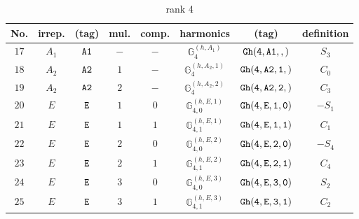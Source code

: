 \documentclass[fleqn,8pt]{jsarticle}
\begin{document}
\begin{table}[ht!]
\begin{center}
\caption{rank 4}
\renewcommand{\arraystretch}{1.3}
\begin{tabular}{cccccccc} \hline \hline
No. & irrep. & (tag) & mul. & comp. & harmonics & (tag) & definition \\ \hline
$ 17 $ & $ A_{1} $ & $ {\tt A1} $ & $ - $ & $ - $ & $ \mathbb{G}_{4}^{(h,A_{1})} $ & $ {\tt Gh(4,A1,,)} $ & $ S_{3} $ \\
$ 18 $ & $ A_{2} $ & $ {\tt A2} $ & $ 1 $ & $ - $ & $ \mathbb{G}_{4}^{(h,A_{2},1)} $ & $ {\tt Gh(4,A2,1,)} $ & $ C_{0} $ \\
$ 19 $ & $ A_{2} $ & $ {\tt A2} $ & $ 2 $ & $ - $ & $ \mathbb{G}_{4}^{(h,A_{2},2)} $ & $ {\tt Gh(4,A2,2,)} $ & $ C_{3} $ \\
$ 20 $ & $ E $ & $ {\tt E} $ & $ 1 $ & $ 0 $ & $ \mathbb{G}_{4,0}^{(h,E,1)} $ & $ {\tt Gh(4,E,1,0)} $ & $ - S_{1} $ \\
$ 21 $ & $ E $ & $ {\tt E} $ & $ 1 $ & $ 1 $ & $ \mathbb{G}_{4,1}^{(h,E,1)} $ & $ {\tt Gh(4,E,1,1)} $ & $ C_{1} $ \\
$ 22 $ & $ E $ & $ {\tt E} $ & $ 2 $ & $ 0 $ & $ \mathbb{G}_{4,0}^{(h,E,2)} $ & $ {\tt Gh(4,E,2,0)} $ & $ - S_{4} $ \\
$ 23 $ & $ E $ & $ {\tt E} $ & $ 2 $ & $ 1 $ & $ \mathbb{G}_{4,1}^{(h,E,2)} $ & $ {\tt Gh(4,E,2,1)} $ & $ C_{4} $ \\
$ 24 $ & $ E $ & $ {\tt E} $ & $ 3 $ & $ 0 $ & $ \mathbb{G}_{4,0}^{(h,E,3)} $ & $ {\tt Gh(4,E,3,0)} $ & $ S_{2} $ \\
$ 25 $ & $ E $ & $ {\tt E} $ & $ 3 $ & $ 1 $ & $ \mathbb{G}_{4,1}^{(h,E,3)} $ & $ {\tt Gh(4,E,3,1)} $ & $ C_{2} $ \\
 \hline \hline
\end{tabular}
\end{center}
\end{table}
\end{document}
